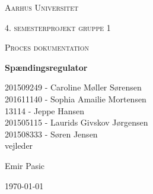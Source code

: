 
\thispagestyle{empty}
{\centering
	{\scshape\LARGE Aarhus Universitet \par}
	\vspace{1cm}
	{\scshape\Large 4. semesterprojekt gruppe 1\par}
	{\scshape\Large Proces dokumentation\par}
	\vspace{1.5cm}
	{\huge\bfseries Spændingsregulator\par}
	\vspace{2cm}
	{\Large
		201509249 - Caroline Møller Sørensen\\
		201611140 - Sophia Amailie Mortensen\\
		13114 - Jeppe Hansen\\ 
		201505115 - Laurids Givskov Jørgensen\\
		201508333 - Søren Jensen\\  }
	\vfill
	vejleder\par
	Emir Pasic
	
	\vfill
	
	{\large \today\par}
	\par}



